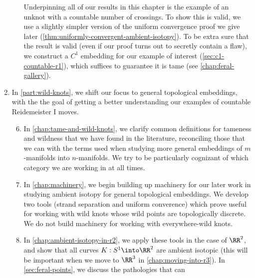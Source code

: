 \begin{enumerate}[label=(\Roman*)]
\begin{enumerate}[label=\arabic*)]
        Underpinning all of our results in this chapter is the example
        of an unknot with a countable number of crossings. To show
        this is valid, we use a slightly simpler version of the
        uniform convergence proof we give later
        (\cref{thm:uniformly-convergent-ambient-isotopy}). To be extra
        sure that the result is valid (even if our proof turns out to
        secretly contain a flaw), we construct a $C^1$ embedding for
        our example of interest (\cref{sec:c1-countable-r1}),
        which suffices to guarantee it is tame (see
        \cref{chap:feral-gallery}).
    \end{enumerate}
  \item In \cref{part:wild-knots}, we shift our focus to general
    topological embeddings, with the the goal of getting a better
    understanding our examples of countable Reidemeister I moves.
    \begin{enumerate}[label=\arabic*)]
        \setcounter{enumii}{5}
      \item In \cref{chap:tame-and-wild-knots}, we clarify common
        definitions for tameness and wildness that we have found in
        the literature, reconciling those that we can with the terms
        used when studying more general embeddings of $m$-manifolds
        into $n$-manifolds. We try to be particularly cognizant of
        which category we are working in at all times.
      \item In \cref{chap:machinery}, we begin building up machinery
        for our later work in studying ambient isotopy for general
        topological embeddings. We develop two tools (strand
        separation and uniform converence) which prove useful for
        working with wild knots whose wild points are topologically
        discrete. We do not build machinery for working with
        everywhere-wild knots.
      \item In \cref{chap:ambient-isotopy-in-r2}, we apply these tools
        in the case of $\RR^2$, and show that all curves $K : S^1
        \into \RR^2$ are ambient isotopic (this will be important when
        we move to $\RR^3$ in \cref{chap:moving-into-r3}). In
        \cref{sec:feral-points}, we discuss the pathologies that can

\end{enumerate}
\end{enumerate}
